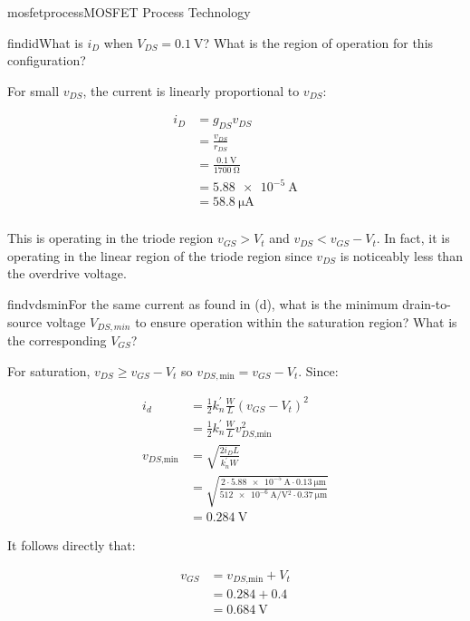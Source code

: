 \begin{mainquestion}{mosfetprocess}{MOSFET Process Technology}
\begin{partquestion}{findid}{What is $i_{D}$ when $V_{DS} = 0.1\ \text{V}$? What is the region of operation for this configuration?}
\begin{answer}
For small $v_{DS}$, the current is linearly proportional to $v_{DS}$:

\begin{align*}
    i_D &= g_{DS} v_{DS} \\
    &= \frac{v_{DS}}{r_{DS}} \\
    &= \frac{\qty{0.1}{\volt}}{\qty{1700}{\ohm}} \\
    &= \qty{5.88e-5}{\ampere} \\
    &= \qty{58.8}{\micro\ampere} \\
\end{align*}

This is operating in the triode region $v_{GS} > V_{t}$ and $v_{DS} < v_{GS} - V_{t}$. In fact, it is operating in the linear region of the triode region since $v_{DS}$ is noticeably less than the overdrive voltage.
\end{answer}
\end{partquestion}

\begin{partquestion}{findvdsmin}{For the same current as found in (d), what is the minimum drain-to-source voltage $V_{DS,min}$ to ensure operation within the saturation region? What is the corresponding $V_{GS}$?}
\begin{answer}
For saturation, $v_{DS} \geq v_{GS} - V_{t}$ so $v_{DS,\text{min}} = v_{GS} - V_{t}$. Since:

\begin{align*}
    i_d &= \frac{1}{2} k^{'}_n \frac{W}{L} (v_{GS}-V_t)^2 \\
    &= \frac{1}{2} k^{'}_n \frac{W}{L} v^2_{DS\text{,min}} \\
    v_{DS\text{,min}} &= \sqrt{\frac{2 i_D L}{k^{'}_n W}} \\
    &= \sqrt{\frac{2 \cdot \qty{5.88e-5}{\ampere} \cdot \qty{0.13}{\micro\meter}}{\qty{512e-6}{\ampere/\volt^2}  \cdot\qty{0.37}{\micro\meter}}} \\
    &= \qty{0.284}{\volt}
\end{align*}

It follows directly that:

\begin{align*}
    v_{GS} &= v_{DS\text{,min}} + V_t \\
    &= 0.284 + 0.4 \\
    &= \qty{0.684}{\volt}
\end{align*}

\end{answer}
\end{partquestion}

\end{mainquestion}
